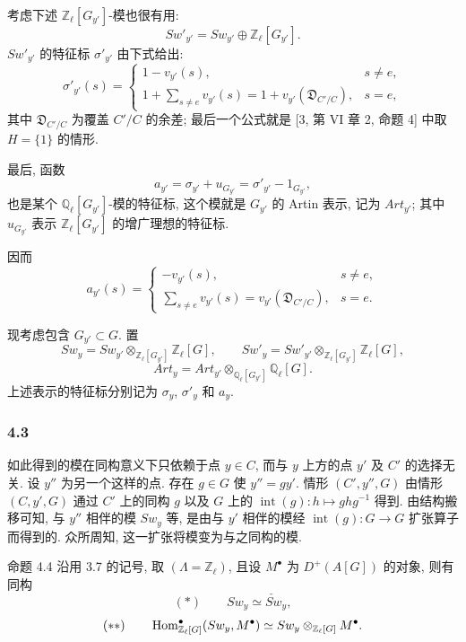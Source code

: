 考虑下述 $\mathbb Z_\ell[G_{y'}]$-模也很有用:
\[
Sw'_{y'}=Sw_{y'}\oplus\mathbb Z_\ell[G_{y'}].
\tag{4.2.3}
\]
$Sw'_{y'}$ 的特征标 $\sigma'_{y'}$ 由下式给出:
\[
\sigma'_{y'}(s)=
\begin{cases}
1-v_{y'}(s),& s\ne e,\\[0.4em]
\displaystyle 1+\sum_{s\ne e}v_{y'}(s)
=1+v_{y'}(\mathfrak D_{C'/C}),& s=e,
\end{cases}
\tag{4.2.4}
\]
其中 $\mathfrak D_{C'/C}$ 为覆盖 $C'/C$ 的余差; 最后一个公式就是 [3, 第 VI 章 2, 命题 4] 中取 $H=\{1\}$ 的情形.

最后, 函数
\[
a_{y'}=\sigma_{y'}+u_{G_{y'}}=\sigma'_{y'}-1_{G_{y'}},
\tag{4.2.5}
\]
也是某个 $\mathbb Q_\ell[G_{y'}]$-模的特征标, 这个模就是 $G_{y'}$ 的 Artin 表示, 记为 $Art_{y'}$; 其中 $u_{G_{y'}}$ 表示 $\mathbb Z_\ell[G_{y'}]$ 的增广理想的特征标.

因而
\[
a_{y'}(s)=
\begin{cases}
-v_{y'}(s),& s\ne e,\\[0.4em]
\displaystyle\sum_{s\ne e}v_{y'}(s)=v_{y'}(\mathfrak D_{C'/C}),& s=e.
\end{cases}
\tag{4.2.6}
\]

现考虑包含 $G_{y'}\subset G$. 置
\[
Sw_y=Sw_{y'}\otimes_{\mathbb Z_\ell[G_{y'}]}\mathbb Z_\ell[G],
\qquad
Sw'_y=Sw'_{y'}\otimes_{\mathbb Z_\ell[G_{y'}]}\mathbb Z_\ell[G],
\tag{4.2.7}
\]
\[
Art_y=Art_{y'}\otimes_{\mathbb Q_\ell[G_{y'}]}\mathbb Q_\ell[G].
\tag{4.2.8}
\]
上述表示的特征标分别记为 $\sigma_y$, $\sigma'_y$ 和 $a_y$.

\subsubsection*{4.3}

如此得到的模在同构意义下只依赖于点 $y\in C$, 而与 $y$ 上方的点 $y'$ 及 $C'$ 的选择无关. 设 $y''$ 为另一个这样的点. 存在 $g\in G$ 使 $y''=g y'$. 情形 $(C',y'',G)$ 由情形 $(C,y',G)$ 通过 $C'$ 上的同构 $g$ 以及 $G$ 上的 $\operatorname{int}(g):h\mapsto ghg^{-1}$ 得到. 由结构搬移可知, 与 $y''$ 相伴的模 $Sw_y$ 等, 是由与 $y'$ 相伴的模经 $\operatorname{int}(g):G\to G$ 扩张算子而得到的. 众所周知, 这一扩张将模变为与之同构的模.

\begin{statement}{命题 4.4}
沿用 3.7 的记号, 取 $(\Lambda=\mathbb Z_\ell)$, 且设 $M^\bullet$ 为 $D^+(A[G])$ 的对象, 则有同构
\[
(*)\qquad Sw_y\simeq \check{Sw}_y,
\]
\[
(**)\qquad
\operatorname{Hom}^\bullet_{\mathbb Z_\ell[G]}(Sw_y,M^\bullet)
\simeq Sw_y\otimes_{\mathbb Z_\ell[G]}M^\bullet.
\]
\end{statement}


